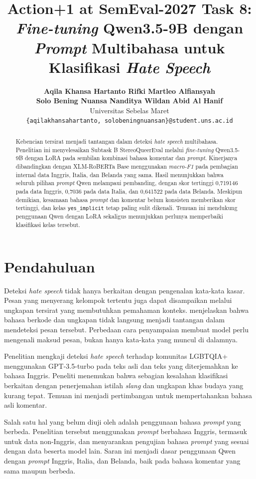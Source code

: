 \documentclass[11pt]{article}
\title{Action+1 at SemEval-2027 Task 8: \textit{Fine-tuning} Qwen3.5-9B dengan \textit{Prompt} Multibahasa untuk Klasifikasi \textit{Hate Speech}}
\author{\textbf{Aqila Khansa Hartanto \quad Rifki Martleo Alfiansyah} \\
\textbf{Solo Bening Nuansa Nanditya \quad Wildan Abid Al Hanif} \\
Universitas Sebelas Maret \\
\texttt{\{aqilakhansahartanto, solobeningnuansan\}@student.uns.ac.id}}
\renewcommand{\abstractname}{Abstrak}
\begin{document}
\renewcommand{\abstractname}{Abstrak}
\pagestyle{plain}
\raggedbottom
\maketitle
\begin{abstract}
Kebencian tersirat menjadi tantangan dalam deteksi \textit{hate speech} multibahasa. Penelitian ini menyelesaikan Subtask B StereoQueerEval melalui \textit{fine-tuning} Qwen3.5-9B dengan LoRA pada sembilan kombinasi bahasa komentar dan \textit{prompt}. Kinerjanya dibandingkan dengan XLM-RoBERTa Base menggunakan \textit{macro-F1} pada pembagian internal data Inggris, Italia, dan Belanda yang sama. Hasil menunjukkan bahwa seluruh pilihan \textit{prompt} Qwen melampaui pembanding, dengan skor tertinggi 0,719146 pada data Inggris, 0,7036 pada data Italia, dan 0,641522 pada data Belanda. Meskipun demikian, kesamaan bahasa \textit{prompt} dan komentar belum konsisten memberikan skor tertinggi, dan kelas \texttt{yes\_implicit} tetap paling sulit dikenali. Temuan ini mendukung penggunaan Qwen dengan LoRA sekaligus menunjukkan perlunya memperbaiki klasifikasi kelas tersebut.
\end{abstract}

\section{Pendahuluan}
\label{sec:pendahuluan}

Deteksi \textit{hate speech} tidak hanya berkaitan dengan pengenalan kata-kata kasar. Pesan yang menyerang kelompok tertentu juga dapat disampaikan melalui ungkapan tersirat yang membutuhkan pemahaman konteks. \citet{elsherief-etal-2021-latent} menjelaskan bahwa bahasa berkode dan ungkapan tidak langsung menjadi tantangan dalam mendeteksi pesan tersebut. Perbedaan cara penyampaian membuat model perlu mengenali maksud pesan, bukan hanya kata-kata yang muncul di dalamnya.

Penelitian \citet{chan-etal-2024-hate} mengkaji deteksi \textit{hate speech} terhadap komunitas LGBTQIA+ menggunakan GPT-3.5-turbo pada teks asli dan teks yang diterjemahkan ke bahasa Inggris. Peneliti menemukan bahwa sebagian kesalahan klasifikasi berkaitan dengan penerjemahan istilah \textit{slang} dan ungkapan khas budaya yang kurang tepat. Temuan ini menjadi pertimbangan untuk mempertahankan bahasa asli komentar.

Salah satu hal yang belum diuji oleh \citet{chan-etal-2024-hate} adalah penggunaan bahasa \textit{prompt} yang berbeda. Penelitian tersebut menggunakan \textit{prompt} berbahasa Inggris, termasuk untuk data non-Inggris, dan menyarankan pengujian bahasa \textit{prompt} yang sesuai dengan data beserta model lain. Saran ini menjadi dasar penggunaan Qwen dengan \textit{prompt} Inggris, Italia, dan Belanda, baik pada bahasa komentar yang sama maupun berbeda.
\end{document}
